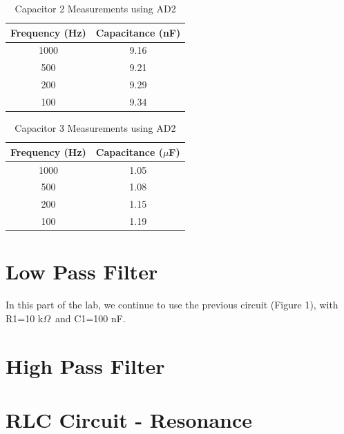 \documentclass{article}
\renewcommand{\O}{\(\Omega\)}
\begin{document}
\begin{table}[H]
    \centering
    \begin{tabular}{c|c}
        Frequency (Hz) & Capacitance (nF)\\
        \hline
        1000 & 9.16\\
        500 & 9.21\\
        200 & 9.29\\
        100 & 9.34
    \end{tabular}
    \caption{Capacitor 2 Measurements using AD2}
\end{table}

\begin{table}[H]
    \centering
    \begin{tabular}{c|c}
        Frequency (Hz) & Capacitance (\(\mu\)F)\\
        \hline
        1000 & 1.05\\
        500 & 1.08\\
        200 & 1.15\\
        100 & 1.19
    \end{tabular}
    \caption{Capacitor 3 Measurements using AD2}
\end{table}

\section{Low Pass Filter}
In this part of the lab, we continue to use the previous circuit (Figure 1), with R1=10 k\O\ and C1=100 nF. 

\section{High Pass Filter}


\section{RLC Circuit - Resonance}
\end{document}
